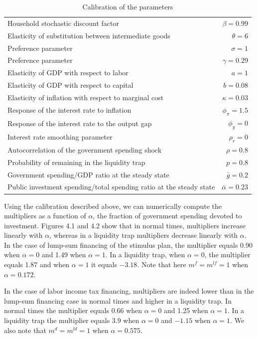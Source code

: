 \documentclass[12pt,letterpaper]{article}
\newcommand{\numtable}[2]{\renewcommand{\thetable}{#1}\caption{#2}\addtocounter{table}{-1}}
\newcommand{\gbar}{\bar{g}}
\newcommand{\abar}{\bar{\alpha}}
\begin{document}
\begin{table}[htbp]
\centering
\numtable{4.1}{Calibration of the parameters}
\begin{tabular}{lr}
\toprule
Household stochastic discount factor & $\beta = 0.99$\\
Elasticity of substitution between intermediate goods & $\theta = 6$\\
Preference parameter & $\sigma = 1$\\
Preference parameter & $\gamma = 0.29$\\
Elasticity of GDP with respect to labor & $a = 1$\\
Elasticity of GDP with respect to capital & $b = 0.08$\\
Elasticity of inflation with respect to marginal cost & $\kappa = 0.03$\\
Response of the interest rate to inflation & $\phi_\pi = 1.5$\\
Response of the interest rate to the output gap & $\phi_y = 0$\\
Interest rate smoothing parameter & $\rho_r = 0$\\
Autocorrelation of the government spending shock & $\rho = 0.8$\\
Probability of remaining in the liquidity trap & $p = 0.8$\\
Government spending/GDP ratio at the steady state & $\gbar = 0.2$\\
Public investment spending/total spending ratio at the steady state & $\abar = 0.23$\\
\bottomrule
\end{tabular}
\end{table}

Using the calibration described above, we can numerically compute the multipliers as a function of $\alpha$, the fraction of government spending devoted to investment. Figures 4.1 and 4.2 show that in normal times, multipliers increase linearly with $\alpha$, whereas in a liquidity trap multipliers decrease linearly with $\alpha$. In the case of lump-sum financing of the stimulus plan, the multiplier equals 0.90 when $\alpha = 0$ and 1.49 when $\alpha = 1$. In a liquidity trap, when $\alpha = 0$, the multiplier equals 1.87 and when $\alpha = 1$ it equals $-3.18$. Note that here $m^f = m^{lf} = 1$ when $\alpha = 0.172$.

In the case of labor income tax financing, multipliers are indeed lower than in the lump-sum financing case in normal times and higher in a liquidity trap. In normal times the multiplier equals 0.66 when $\alpha = 0$ and 1.25 when $\alpha = 1$. In a liquidity trap the multiplier equals 3.9 when $\alpha = 0$ and $-1.15$ when $\alpha = 1$. We also note that $m^d = m^{ld} = 1$ when $\alpha = 0.575$.
\end{document}
